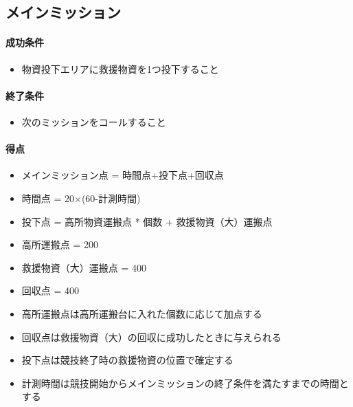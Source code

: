 
\subsection{メインミッション}
\paragraph{成功条件}
\begin{itemize}
\item 物資投下エリアに救援物資を1つ投下すること
\end{itemize}
\paragraph{終了条件}
\begin{itemize}
\item 次のミッションをコールすること
\end{itemize}
\paragraph{得点}
\begin{itemize}
\item メインミッション点 = 時間点+投下点+回収点
\item 時間点 = 20×(60-計測時間)
\item 投下点 = 高所物資運搬点 * 個数 + 救援物資（大）運搬点
\item 高所運搬点 = 200
\item 救援物資（大）運搬点 = 400
\item 回収点 = 400
\item 高所運搬点は高所運搬台に入れた個数に応じて加点する
\item 回収点は救援物資（大）の回収に成功したときに与えられる
\item 投下点は競技終了時の救援物資の位置で確定する
\item 計測時間は競技開始からメインミッションの終了条件を満たすまでの時間とする
\end{itemize}
